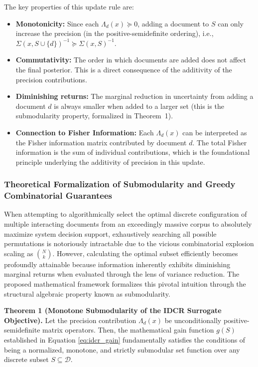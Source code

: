 \documentclass[12pt,a4paper,oneside]{report}
\theoremstyle{definition}
\theoremstyle{remark}
\begin{document}
The key properties of this update rule are:
\begin{itemize}[leftmargin=2em]
  \item \textbf{Monotonicity:} Since each $\Lambda_d(x) \succeq 0$, adding a document to $S$ can only increase the precision (in the positive-semidefinite ordering), i.e., $\Sigma(x, S \cup \{d\})^{-1} \succeq \Sigma(x,S)^{-1}$.
  \item \textbf{Commutativity:} The order in which documents are added does not affect the final posterior. This is a direct consequence of the additivity of the precision contributions.
  \item \textbf{Diminishing returns:} The marginal reduction in uncertainty from adding a document $d$ is always smaller when added to a larger set (this is the submodularity property, formalized in Theorem~1).
  \item \textbf{Connection to Fisher Information:} Each $\Lambda_d(x)$ can be interpreted as the Fisher information matrix contributed by document $d$. The total Fisher information is the sum of individual contributions, which is the foundational principle underlying the additivity of precision in this update.
\end{itemize}

\subsubsection{Theoretical Formalization of Submodularity and Greedy Combinatorial Guarantees}

When attempting to algorithmically select the optimal discrete configuration of multiple interacting documents from an exceedingly massive corpus to absolutely maximize system decision support, exhaustively searching all possible permutations is notoriously intractable due to the vicious combinatorial explosion scaling as $\binom{N}{k}$. However, calculating the optimal subset efficiently becomes profoundly attainable because information inherently exhibits diminishing marginal returns when evaluated through the lens of variance reduction. The proposed mathematical framework formalizes this pivotal intuition through the structural algebraic property known as submodularity.

\textbf{Theorem 1 (Monotone Submodularity of the IDCR Surrogate Objective).} Let the precision contribution $\Lambda_d(x)$ be unconditionally positive-semidefinite matrix operators. Then, the mathematical gain function $g(S)$ established in Equation \ref{eq:idcr_gain} fundamentally satisfies the conditions of being a normalized, monotone, and strictly submodular set function over any discrete subset $S \subseteq \mathcal{D}$.
\end{document}
